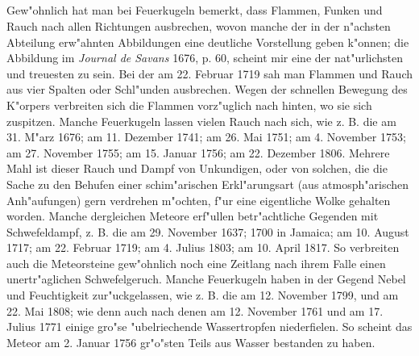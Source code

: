 \documentclass[a4paper, 11pt, oneside, polutonikogreek, german]{article}
\begin{document}
\subsection{}
\paragraph{}
Gew"ohnlich hat man bei Feuerkugeln bemerkt, dass Flammen, Funken und Rauch nach allen Richtungen ausbrechen, wovon manche der in der n"achsten Abteilung erw"ahnten Abbildungen eine deutliche Vorstellung geben k"onnen; die Abbildung im \emph{Journal de Savans} 1676, p. 60, scheint mir eine der nat"urlichsten und treuesten zu sein. Bei der am 22. Februar 1719 sah man Flammen und Rauch aus vier Spalten oder Schl"unden ausbrechen. Wegen der schnellen Bewegung des K"orpers verbreiten sich die Flammen vorz"uglich nach hinten, wo sie sich zuspitzen. Manche Feuerkugeln lassen vielen Rauch nach sich, wie z. B. die am 31. M"arz 1676; am 11. Dezember 1741; am 26. Mai 1751; am 4. November 1753; am 27. November 1755; am 15. Januar 1756; am 22. Dezember 1806. Mehrere Mahl ist dieser Rauch und Dampf von Unkundigen, oder von solchen, die die Sache zu den Behufen einer schim"arischen Erkl"arungsart (aus atmosph"arischen Anh"aufungen) gern verdrehen m"ochten, f"ur eine eigentliche Wolke gehalten worden. Manche dergleichen Meteore erf"ullen betr"achtliche Gegenden mit Schwefeldampf, z. B. die am 29. November 1637; 1700 in Jamaica; am 10. August 1717; am 22. Februar 1719; am 4. Julius 1803; am 10. April 1817. So verbreiten auch die Meteorsteine gew"ohnlich noch eine Zeitlang nach ihrem Falle einen unertr"aglichen Schwefelgeruch. Manche Feuerkugeln haben in der Gegend Nebel und Feuchtigkeit zur"uckgelassen, wie z. B. die am 12. November 1799, und am 22. Mai 1808; wie denn auch nach denen am 12. November 1761 und am 17. Julius 1771 einige gro"se "ubelriechende Wassertropfen niederfielen. So scheint das Meteor am 2. Januar 1756 gr"o"sten Teils aus Wasser bestanden zu haben.
\end{document}
